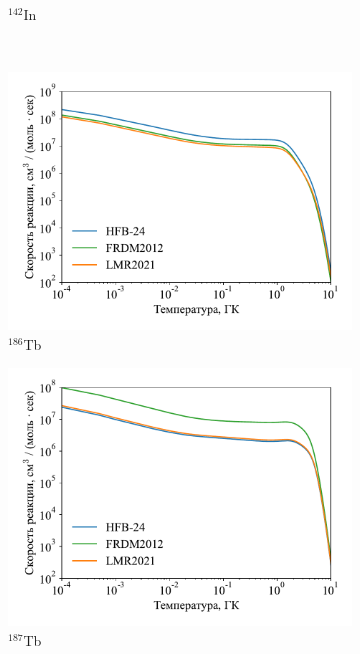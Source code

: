 \begin{figure}
\begin{subfigure}{0.48\textwidth}
    \caption{${}^{142}$In}
  \end{subfigure}
  \\
  \begin{subfigure}{0.48\textwidth}
    \centering
    \includegraphics[width=\textwidth]{pics/rate_tb186.pdf}
    \caption{${}^{186}$Tb}
  \end{subfigure}
  \hfil
  \begin{subfigure}{0.48\textwidth}
    \centering
    \includegraphics[width=\textwidth]{pics/rate_tb187.pdf}
    \caption{${}^{187}$Tb}
  \end{subfigure}
  \\
  \begin{subfigure}{0.48\textwidth}
    \centering

\end{subfigure}
\end{figure}
